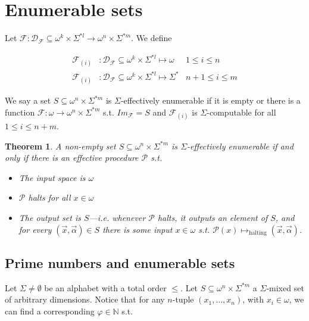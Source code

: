 \documentclass[a4paper, 12pt]{article}
\newtheorem{theorem}{Theorem}
\newtheorem{theorem}{Theorem}
\begin{document}
\section{Enumerable sets}

Let $\mathcal{F} : \mathcal{D}_{\mathcal{F}} \subseteq \omega^{k} \times \Sigma^{*l} \to \omega^n
\times \Sigma^{*m}$. We define

\begin{align*}
    \mathcal{F}_{(i)} &: \mathcal{D}_{\mathcal{F}} \subseteq \omega^{k} \times
    \Sigma^{*l}  \mapsto \omega & 1 \leq i \leq n\\
    \mathcal{F}_{(i)} &: \mathcal{D}_{\mathcal{F}} \subseteq \omega^{k} \times
    \Sigma^{*l} \mapsto  \Sigma^{*} & n + 1 \leq i \leq m
\end{align*}

We say a set $S \subseteq \omega^n \times \Sigma^{*m} $ is $\Sigma$-effectively
enumerable  if it is empty or there is a function $\mathcal{F} : \omega \to
\omega^n \times \Sigma^{*m}$ s.t. $Im_{\mathcal{F}} = S$ and $\mathcal{F}_{(i)}$
is $\Sigma$-computable for all $1 \leq i \leq n + m$.

\begin{theorem}
    A non-empty set $S \subseteq \omega^n \times \Sigma^{*m}$ is
    $\Sigma$-effectively enumerable if and only if there is an effective
    procedure $\mathcal{P}$ s.t. 

    \begin{itemize}
        \item The input space is $\omega$
        \item $\mathcal{P}$ halts for all $x \in \omega$ 
        \item The output set is $S$---i.e. whenever $\mathcal{P}$ halts, it
            outputs an element of $S$, and for every $(\overrightarrow{x},
            \overrightarrow{\alpha}) \in S$ there is some input $x \in \omega$
        s.t. $\mathcal{P}(x) \mapsto_{\text{halting}} (\overrightarrow{x},
        \overrightarrow{\alpha})$.
    \end{itemize}
\end{theorem}

\subsection{Prime numbers and enumerable sets}

Let $\Sigma \neq \emptyset$ be an alphabet with a total order $\leq$. Let $S
\subseteq \omega^{n} \times \Sigma^{*m}$ a $\Sigma$-mixed set of arbitrary
dimensions. Notice that for any $n$-tuple $(x_1, \ldots, x_n)$, with $x_i \in
\omega$, we can find a corresponding $\varphi \in \mathbb{N}$ s.t. 
\end{document}
